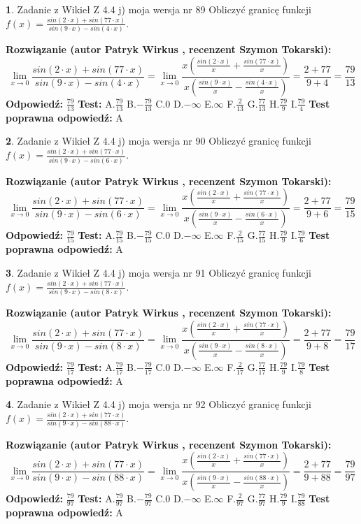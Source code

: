 \documentclass[12pt, a4paper]{article}
\theoremstyle{definition} %
\newtheorem{zad}{}
\newcommand{\zadStart}[1]{\begin{zad}#1\newline}
\newcommand{\zadStop}{\end{zad}}
\newcommand{\rozwStart}[2]{\noindent \textbf{Rozwiązanie (autor #1 , recenzent #2): }\newline}
\newcommand{\rozwStop}{\newline}
\newcommand{\odpStart}{\noindent \textbf{Odpowiedź:}\newline}
\newcommand{\odpStop}{\newline}
\newcommand{\testStart}{\noindent \textbf{Test:}\newline}
\newcommand{\testStop}{\newline}
\newcommand{\kluczStart}{\noindent \textbf{Test poprawna odpowiedź:}\newline}
\newcommand{\kluczStop}{\newline}
\begin{document}
\zadStart{Zadanie z Wikieł Z 4.4 j) moja wersja nr 89}
Obliczyć granicę funkcji $f(x)=\frac{sin(2\cdot x) +sin(77\cdot x)}{sin(9\cdot x) -sin(4\cdot x)}$.
\zadStop
\rozwStart{Patryk Wirkus}{Szymon Tokarski}
$$\lim\limits_{x\to 0}\frac{sin(2\cdot x) +sin(77\cdot x)}{sin(9\cdot x) -sin(4\cdot x)}=\lim\limits_{x\to 0}\frac{x(\frac{sin(2\cdot x)}{x}+\frac{sin(77\cdot x)}{x})}{x(\frac{sin(9\cdot x)}{x}-\frac{sin(4\cdot x)}{x})}=\frac{2+77}{9+4} = \frac{79}{13}$$
\rozwStop
\odpStart
$\frac{79}{13}$
\odpStop
\testStart
A.$\frac{79}{13}$
B.$-\frac{79}{13}$
C.$0$
D.$-\infty$
E.$\infty$
F.$\frac{2}{13}$
G.$\frac{77}{13}$
H.$\frac{79}{9}$
I.$\frac{79}{4}$
\testStop
\kluczStart
A
\kluczStop



\zadStart{Zadanie z Wikieł Z 4.4 j) moja wersja nr 90}
Obliczyć granicę funkcji $f(x)=\frac{sin(2\cdot x) +sin(77\cdot x)}{sin(9\cdot x) -sin(6\cdot x)}$.
\zadStop
\rozwStart{Patryk Wirkus}{Szymon Tokarski}
$$\lim\limits_{x\to 0}\frac{sin(2\cdot x) +sin(77\cdot x)}{sin(9\cdot x) -sin(6\cdot x)}=\lim\limits_{x\to 0}\frac{x(\frac{sin(2\cdot x)}{x}+\frac{sin(77\cdot x)}{x})}{x(\frac{sin(9\cdot x)}{x}-\frac{sin(6\cdot x)}{x})}=\frac{2+77}{9+6} = \frac{79}{15}$$
\rozwStop
\odpStart
$\frac{79}{15}$
\odpStop
\testStart
A.$\frac{79}{15}$
B.$-\frac{79}{15}$
C.$0$
D.$-\infty$
E.$\infty$
F.$\frac{2}{15}$
G.$\frac{77}{15}$
H.$\frac{79}{9}$
I.$\frac{79}{6}$
\testStop
\kluczStart
A
\kluczStop



\zadStart{Zadanie z Wikieł Z 4.4 j) moja wersja nr 91}
Obliczyć granicę funkcji $f(x)=\frac{sin(2\cdot x) +sin(77\cdot x)}{sin(9\cdot x) -sin(8\cdot x)}$.
\zadStop
\rozwStart{Patryk Wirkus}{Szymon Tokarski}
$$\lim\limits_{x\to 0}\frac{sin(2\cdot x) +sin(77\cdot x)}{sin(9\cdot x) -sin(8\cdot x)}=\lim\limits_{x\to 0}\frac{x(\frac{sin(2\cdot x)}{x}+\frac{sin(77\cdot x)}{x})}{x(\frac{sin(9\cdot x)}{x}-\frac{sin(8\cdot x)}{x})}=\frac{2+77}{9+8} = \frac{79}{17}$$
\rozwStop
\odpStart
$\frac{79}{17}$
\odpStop
\testStart
A.$\frac{79}{17}$
B.$-\frac{79}{17}$
C.$0$
D.$-\infty$
E.$\infty$
F.$\frac{2}{17}$
G.$\frac{77}{17}$
H.$\frac{79}{9}$
I.$\frac{79}{8}$
\testStop
\kluczStart
A
\kluczStop



\zadStart{Zadanie z Wikieł Z 4.4 j) moja wersja nr 92}
Obliczyć granicę funkcji $f(x)=\frac{sin(2\cdot x) +sin(77\cdot x)}{sin(9\cdot x) -sin(88\cdot x)}$.
\zadStop
\rozwStart{Patryk Wirkus}{Szymon Tokarski}
$$\lim\limits_{x\to 0}\frac{sin(2\cdot x) +sin(77\cdot x)}{sin(9\cdot x) -sin(88\cdot x)}=\lim\limits_{x\to 0}\frac{x(\frac{sin(2\cdot x)}{x}+\frac{sin(77\cdot x)}{x})}{x(\frac{sin(9\cdot x)}{x}-\frac{sin(88\cdot x)}{x})}=\frac{2+77}{9+88} = \frac{79}{97}$$
\rozwStop
\odpStart
$\frac{79}{97}$
\odpStop
\testStart
A.$\frac{79}{97}$
B.$-\frac{79}{97}$
C.$0$
D.$-\infty$
E.$\infty$
F.$\frac{2}{97}$
G.$\frac{77}{97}$
H.$\frac{79}{9}$
I.$\frac{79}{88}$
\testStop
\kluczStart
A
\kluczStop
\end{document}
